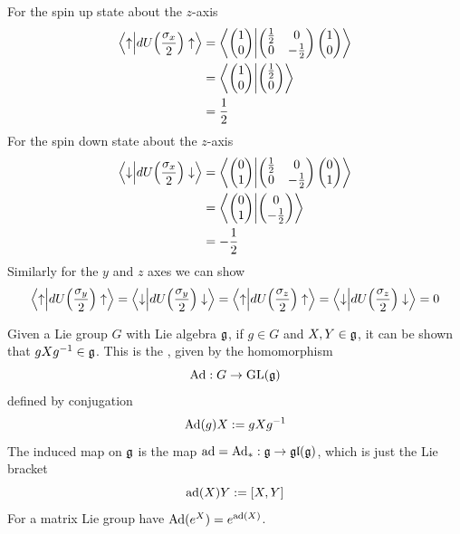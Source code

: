 \documentclass[10pt]{article}
\begin{document}
For the spin up state about the $z$-axis
$$
\begin{aligned}
	\ip{\uparrow}{dU\p*{\frac{\sigma_x}{2}}\uparrow} &= \ip{\begin{pmatrix}
		1\\0
	\end{pmatrix}}{\begin{pmatrix}
		\frac12&0\\0&-\frac12
	\end{pmatrix}\begin{pmatrix}
		1\\0
	\end{pmatrix}}\\
	&= \ip{\begin{pmatrix}
		1\\0
	\end{pmatrix}}{\begin{pmatrix}
		\frac12\\0
	\end{pmatrix}}\\
	&= \frac12
\end{aligned}
$$
For the spin down state about the $z$-axis
$$
\begin{aligned}
	\ip{\downarrow}{dU\p*{\frac{\sigma_x}{2}}\downarrow} &= \ip{\begin{pmatrix}
		0\\1
	\end{pmatrix}}{\begin{pmatrix}
		\frac12&0\\0&-\frac12
	\end{pmatrix}\begin{pmatrix}
		0\\1
	\end{pmatrix}}\\
	&= \ip{\begin{pmatrix}
		0\\1
	\end{pmatrix}}{\begin{pmatrix}
		0\\-\frac12
	\end{pmatrix}}\\
	&= -\frac12
\end{aligned}
$$
Similarly for the $y$ and $z$ axes we can show
$$
\ip{\uparrow}{dU\p*{\frac{\sigma_y}{2}}\uparrow} = \ip{\downarrow}{dU\p*{\frac{\sigma_y}{2}}\downarrow} = \ip{\uparrow}{dU\p*{\frac{\sigma_z}{2}}\uparrow} = \ip{\downarrow}{dU\p*{\frac{\sigma_z}{2}}\downarrow} = 0
$$


\begin{definition}
	Given a Lie group $G$ with Lie algebra $\mathfrak{g}$, if $g \in G$ and $X,Y \in \mathfrak{g}$, it can be shown that $gXg^{-1} \in \mathfrak{g}$. This is the , given by the homomorphism 
	$$
		\text{Ad} : G \to \text{GL}(\mathfrak{g})
	$$
	defined by conjugation
	$$
		\text{Ad}(g)X := gXg^{-1}
	$$
	The induced map on $\mathfrak{g}$ is the map $\text{ad} = \text{Ad}_*: \mathfrak{g} \to \mathfrak{gl}(\mathfrak{g})$, which is just the Lie bracket
	$$
		\text{ad}(X)Y := [X, Y]
	$$
	For a matrix Lie group have $\text{Ad} \lparen e^X\rparen = e^{\text{ad} \lparen X\rparen}$.
\end{definition}
\end{document}
